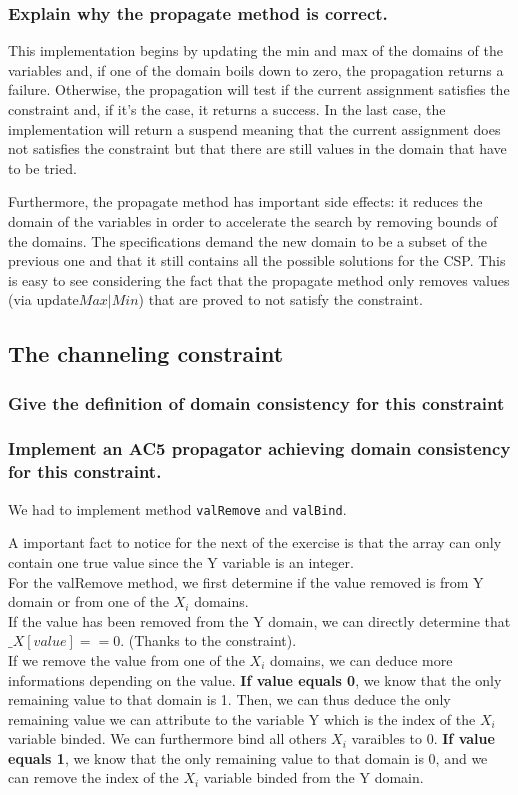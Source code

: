 \documentclass[a4paper ,12pt,french]{article}
\begin{document}
\subsubsection{Explain why the propagate method is correct.}
This implementation begins by updating the min and max of the domains of the variables and, if one of the domain boils down to zero, the propagation returns a failure. Otherwise, the propagation will test if the current assignment satisfies the constraint and, if it's the case, it returns a success. 
In the last case, the implementation will return a suspend meaning that the current assignment does not satisfies the constraint but that there are still values in the domain that have to be tried. 

Furthermore, the propagate method has important side effects: it reduces the domain of the variables in order to accelerate the search by removing bounds of the domains. The specifications demand the new domain to be a subset of the previous one and that it still contains all the possible solutions for the CSP. This is easy to see considering the fact that the propagate method only removes values (via update$Max\vert Min$) that are proved to not satisfy the constraint.


\subsection{The channeling constraint}
\subsubsection{Give the definition of domain consistency for this constraint}
\subsubsection{Implement an AC5 propagator achieving domain consistency for this constraint.}
We had to implement method \texttt{valRemove} and \texttt{valBind}.

A important fact to notice for the next of the exercise is that the array can only contain one true value since the Y variable is an integer.\\

For the valRemove method, we first determine if the value removed is from Y domain or from one of the $X_i$ domains.\\
If the value has been removed  from the Y domain, we can directly determine that $\_X[value] == 0$. (Thanks to the constraint).\\
If we remove the value from one of the $X_i$ domains, we can deduce more informations depending on the value. \textbf{If value equals 0}, we know that the only remaining value to that domain is 1. Then, we can thus deduce the only remaining value we can attribute to the variable Y which is the index of the $X_i$ variable binded. We can furthermore bind all others $X_i$ varaibles to 0.  \textbf{If value equals 1}, we know that the only remaining value to that domain is 0, and we can remove the index of the $X_i$ variable binded from the Y domain.
\end{document}
